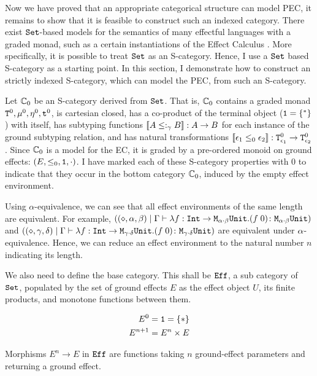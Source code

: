 \documentclass{Report}
\begin{document}
Now we have proved that an appropriate categorical structure can model PEC, it remains to show that it is feasible to construct such an indexed category. There exist $\texttt{Set}$-based models for the semantics of many effectful languages with a graded monad, such as a certain instantiations of the Effect Calculus \needsRef{}. More specifically, it is possible to treat $\texttt{Set}$ as an S-category. Hence, I use a $\texttt{Set}$ based S-category as a starting point. In this section, I  demonstrate how to construct an strictly indexed S-category, which can model the PEC, from such an S-category.

Let $\mathbb{C}_0$ be an S-category derived from $\texttt{Set}$. That is, $\mathbb{C}_0$ contains a graded monad $\texttt{T}^0_{}, \mu^0, \eta_{}^0, \texttt{t}^0$, is cartesian closed, has a co-product of the terminal object ($\texttt{1} = \left\{^*\right\}$) with itself, has subtyping functions ${\bf [\![}A\leq:_\gamma B{\bf ]\!]}: A \rightarrow B$ for each instance of the ground subtyping relation, and has natural transformations ${\bf [\![}\epsilon_1 \leq_0 \epsilon_2{\bf ]\!]}: \texttt{T}^0_{\epsilon_1} \rightarrow \texttt{T}^0_{\epsilon_2}$. Since $\mathbb{C}_0$ is a model for the EC, it is graded by a pre-ordered monoid on ground effects: $(E, \leq_0, \texttt{1}, \cdot)$. I have marked each of these S-category properties with $0$ to indicate that they occur in the bottom category $\mathbb{C}_0$, induced by the empty effect environment.


Using $\alpha$-equivalence, we can see that all effect environments of the same length are equivalent. For example, $((\diamond, \alpha, \beta)\mid\Gamma \vdash \lambda f : \texttt{Int}\rightarrow \texttt{M}_{\alpha\cdot\beta}{\texttt{Unit}}. (f\;0) \colon \texttt{M}_{\alpha\cdot\beta}{\texttt{Unit}})$ and $((\diamond, \gamma, \delta)\mid\Gamma \vdash \lambda f : \texttt{Int}\rightarrow \texttt{M}_{\gamma\cdot\delta}{\texttt{Unit}}. (f\;0) \colon \texttt{M}_{\gamma\cdot\delta}{\texttt{Unit}})$ are equivalent under $\alpha$-equivalence. Hence, we can reduce an effect environment to the natural number $n$ indicating its length.


We also need to define the base category. This shall be $\texttt{Eff}$, a sub category of $\texttt{Set}$, populated by the set of ground effects $E$ as the effect object $U$, its finite products, and monotone functions between them.

\begin{align}
    E^0 & = \texttt{1} = \left\{\ast\right\}\\
    E^{n+1} &= E^n \times E
\end{align}

Morphisms $E^n \rightarrow E$ in $\texttt{Eff}$ are functions taking $n$ ground-effect parameters and returning a ground effect.
\end{document}
